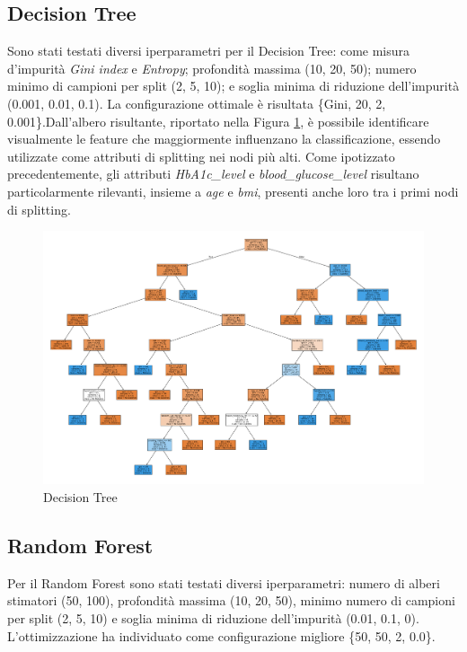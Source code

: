\documentclass[conference]{IEEEtran}
\begin{document}
\subsection{Decision Tree}
Sono stati testati diversi iperparametri per il Decision Tree: come misura d’impurità \textit{Gini index} e \textit{Entropy}; profondità massima (10, 20, 50); numero minimo di campioni per split (2, 5, 10); e soglia minima di riduzione dell’impurità (0.001, 0.01, 0.1). La configurazione ottimale è risultata \{Gini, 20, 2, 0.001\}.Dall’albero risultante, riportato nella Figura \ref{tree}, è possibile identificare visualmente le feature che maggiormente influenzano la classificazione, essendo utilizzate come attributi di splitting nei nodi più alti. Come ipotizzato precedentemente, gli attributi \emph{HbA1c\_level} e \emph{blood\_glucose\_level} risultano particolarmente rilevanti, insieme a \emph{age} e \emph{bmi}, presenti anche loro tra i primi nodi di splitting.


\begin{figure} [H]
    \centering
    \includegraphics[width=\linewidth]{DecisionTree.pdf}
    \caption{Decision Tree}
    \label{tree}
\end{figure}

\subsection{Random Forest}
Per il Random Forest sono stati testati diversi iperparametri: numero di alberi stimatori (50, 100), profondità massima (10, 20, 50), minimo numero di campioni per split (2, 5, 10) e soglia minima di riduzione dell’impurità (0.01, 0.1, 0). L’ottimizzazione ha individuato come configurazione migliore \{50, 50, 2, 0.0\}.
\end{document}
